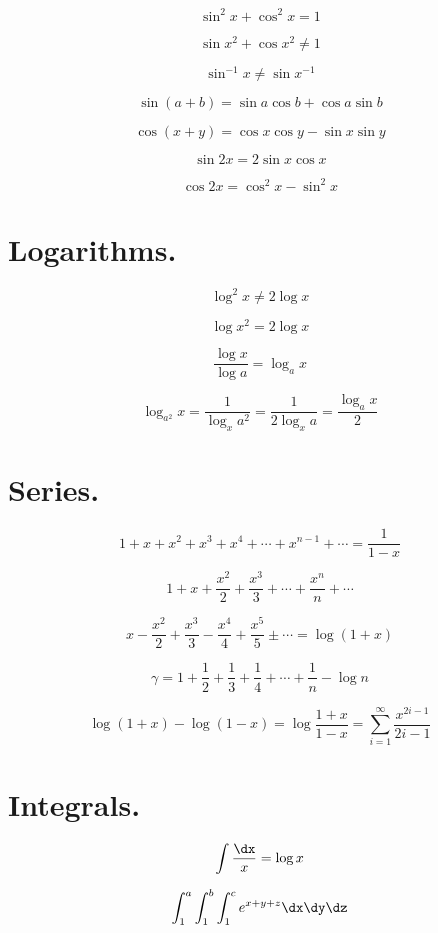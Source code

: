 $$\sin^2x+\cos^2x=1$$

$$\sin x^2 + \cos x^2 \neq 1 $$

$$\sin^{-1}x \neq \sin x^{-1}$$

$$\sin (a+b) = \sin a \cos b + \cos a \sin b$$

$$\cos (x+y)=\cos x \cos y - \sin x \sin y$$

$$\sin 2x = 2 \sin x \cos x $$

$$\cos 2x = \cos^2 x -\sin^2 x$$



\section{Logarithms. }

$$\log^2x\neq2\log x$$

$$\log x^2=2\log x$$

$$\frac{\log x}{\log a} = \log_a x$$

$$\log_{a^2} x = \frac{1}{\log_x a^2}= \frac{1}{2\log_x a} =
\frac{\log_a x}{2}$$ 



\section{Series. }

$$1+x+x^2+x^3+x^4+\cdots+x^{n-1}+\cdots  = \frac{1}{1-x}$$

$$1+x+\frac{x^2}{2}+\frac{x^3}{3}+\cdots +\frac{x^n}{n}+\cdots$$

$$  x - \frac{x^2}{2} +\frac{x^3}{3}
-\frac{x^4}{4}+\frac{x^5}{5} \pm \cdots  = \log(1+x)$$

$$\gamma = 1+\frac{1}{2}+\frac{1}{3} +\frac{1}{4} +\cdots +\frac{1}{n}
-\log n $$

$$\log (1+x) - \log (1-x) = \log \frac{1+x}{1-x} = \sum_{i=1}^\infty
\frac{x^{2i-1}}{2i -1}$$


\section{Integrals. }


$$\int\frac{\dx}{x} =\log x$$

$$\int_1^a \int_1^b\int_1^c e^{x+y+z}\dx\dy\dz$$

